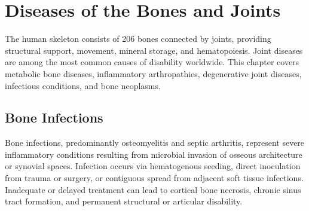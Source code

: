 \chapter{Diseases of the Bones and Joints}
\label{ch:bones}
The human skeleton consists of 206 bones connected by joints, providing structural support, movement, mineral storage, and hematopoiesis. Joint diseases are among the most common causes of disability worldwide. This chapter covers metabolic bone diseases, inflammatory arthropathies, degenerative joint diseases, infectious conditions, and bone neoplasms.

\section{Bone Infections}




Bone infections, predominantly osteomyelitis and septic arthritis, represent severe inflammatory conditions resulting from microbial invasion of osseous architecture or synovial spaces. Infection occurs via hematogenous seeding, direct inoculation from trauma or surgery, or contiguous spread from adjacent soft tissue infections. Inadequate or delayed treatment can lead to cortical bone necrosis, chronic sinus tract formation, and permanent structural or articular disability.





\label{sec:Bone Infections}

